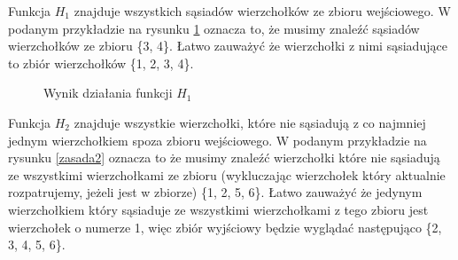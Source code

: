 Funkcja $H_1$ znajduje wszystkich sąsiadów wierzchołków ze zbioru wejściowego. W podanym przykładzie na rysunku \ref{zasada1} oznacza to, że musimy znaleźć sąsiadów wierzchołków ze zbioru \{3, 4\}. Łatwo zauważyć że wierzchołki z nimi sąsiadujące to zbiór wierzchołków \{1, 2, 3, 4\}.

 \begin{figure}[H]
  \centering
    \hspace{15mm}
    \caption{Wynik działania funkcji $H_1$}
 \label{zasada1}
 \end{figure}

Funkcja $H_2$ znajduje wszystkie wierzchołki, które nie sąsiadują z co najmniej jednym wierzchołkiem spoza zbioru wejściowego. W podanym przykładzie na rysunku \ref{zasada2} oznacza to że musimy znaleźć wierzchołki które nie sąsiadują ze wszystkimi wierzchołkami ze zbioru (wykluczając wierzchołek który aktualnie rozpatrujemy, jeżeli jest w zbiorze) \{1, 2, 5, 6\}. Łatwo zauważyć że jedynym wierzchołkiem który sąsiaduje ze wszystkimi wierzchołkami z tego zbioru jest wierzchołek o numerze 1, więc zbiór wyjściowy będzie wyglądać następująco \{2, 3, 4, 5, 6\}.

